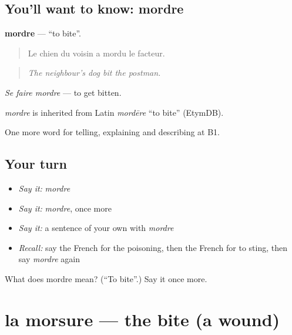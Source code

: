 \subsection*{You'll want to know: mordre}
\textbf{mordre} — \textquotedblleft{}to bite\textquotedblright{}.

\begin{quote}
Le chien du voisin a mordu le facteur.
\end{quote}

\begin{quote}
\emph{The neighbour's dog bit the postman.}
\end{quote}

\emph{Se faire mordre} — to get bitten.

\begin{cousinweb}
\emph{mordre} is inherited from Latin \emph{mordēre} \textquotedblleft{}to bite\textquotedblright{} (EtymDB).
\end{cousinweb}

\begin{grammarlens}[title={What you've built}]
One more word for telling, explaining and describing at B1.
\end{grammarlens}

\subsection*{Your turn}
\begin{itemize}
\raggedright
  \item \emph{Say it:} \emph{mordre}
  \item \emph{Say it:} \emph{mordre}, once more
  \item \emph{Say it:} a sentence of your own with \emph{mordre}
  \item \emph{Recall:} say the French for the poisoning, then the French for to sting, then say \emph{mordre} again
\end{itemize}

\begin{tcolorbox}[breakable,colback=teal!4,colframe=teal!35!black,title={Before you move on}]
What does mordre mean? (\textquotedblleft{}To bite\textquotedblright{}.) Say it once more.
\end{tcolorbox}
\section[la morsure]{la morsure — the bite (a wound)}

\label{lesson:FR-C306-morsure}



